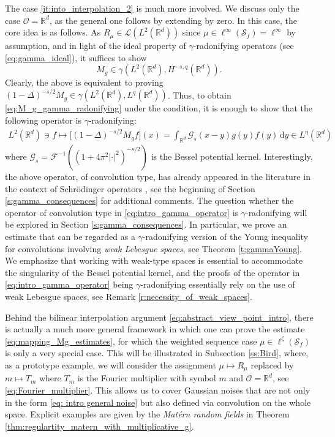 \documentclass[reqno]{amsart}
\theoremstyle{plain}
\theoremstyle{remark}
\theoremstyle{plain}
\numberwithin{equation}{section}
\newcommand\calL{\mathcal{L}}
\newcommand\cO{\mathcal{O}}
\def\R{{\mathbb R}}
\newcommand{\g}{\gamma}
\newcommand{\di}{\mathrm{d}}
\newcommand{\1}{\one}
\newcommand{\Sf}{\mathcal{S}_{f}}
\begin{document}
The case \eqref{it:into_interpolation_2} is much more involved. We discuss only the case $\cO=\R^d$, as the general one follows by extending by zero. In this case, the core idea is as follows. 
As $R_\mu\in \calL(L^2(\R^d))$ since $\mu\in \ell^\infty(\Sf)=\ell^\infty$ by assumption, and in light of the ideal property of $\g$-radonifying operators (see \eqref{eq:gamma_ideal}), it suffices to show 
\begin{equation}
\label{eq:M_g_gamma_radonifying}
M_g \in \g(L^2(\R^d),H^{-s,q}(\R^d)).
\end{equation}
Clearly, the above is equivalent to proving $ (1-\Delta)^{-s/2} M_g \in \g(L^2(\R^d),L^q(\R^d))$. Thus, to obtain \eqref{eq:M_g_gamma_radonifying} under the condition, it is enough to show that the following operator is $\g$-radonifying: 
\begin{align}
\label{eq:intro_gamma_operator}
L^2(\R^d)\ni
f\mapsto \big[(1-\Delta)^{-s/2} M_g f\big](x)= \int_{\R^d} \mathscr{G}_s(x-y) g(y)f (y)\,\di y\in L^\eta(\R^d)
\end{align}
where $\mathscr{G}_s=\mathscr{F}^{-1} ((1+4\pi^2|\cdot|^2)^{-s/2})$ is the Bessel potential kernel. 
Interestingly, the above operator, of convolution type, has already appeared in the literature in the context of Schr\"odinger operators \cite{Cwikel,LevSuZan,Simon76}, see the beginning of Section \ref{s:gamma_consequences} for additional comments.
The question whether the operator of convolution type in \eqref{eq:intro_gamma_operator} is $\g$-radonifying will be explored in Section \ref{s:gamma_consequences}. In particular, we prove an estimate that can be regarded as a $\g$-radonifying version of the Young inequality for convolutions involving \emph{weak Lebesgue spaces}, see Theorem \ref{t:gammaYoung}. We emphasize that working with weak-type spaces is essential to accommodate the singularity of the Bessel potential kernel, and the proofs of the operator in \eqref{eq:intro_gamma_operator} being $\g$-radonifying essentially rely on the use of weak Lebesgue spaces, see Remark \ref{r:necessity_of_weak_spaces}.

\smallskip

Behind the bilinear interpolation argument \eqref{eq:abstract_view_point_intro}, there is actually a much more general framework in which one can prove the estimate \eqref{eq:mapping_Mg_estimates}, for which the weighted sequence case $\mu\in \ell^\zeta(\Sf)$ is only a very special case. This will be illustrated in Subsection \ref{ss:Bird}, where, as a prototype example, we will consider the assignment $\mu \mapsto R_\mu$ replaced by $m\mapsto T_m$ where $T_m$ is the Fourier multiplier with symbol $m$ and $\cO=\R^d$, see \eqref{eq:Fourier_multiplier}. This allows us to cover Gaussian noises that are not only in the form \eqref{eq: intro general noise} but also defined via convolution on the whole space.
Explicit examples are given by the \emph{Mat\'ern random fields} in Theorem \ref{thm:regulartity_matern_with_multiplicative_g}. 
\end{document}
